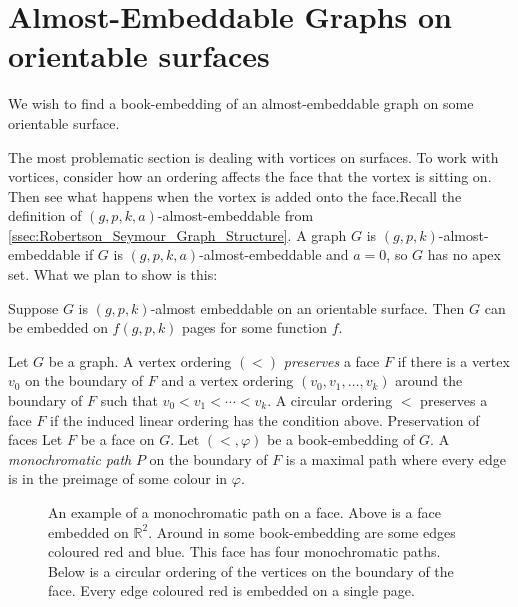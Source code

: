 \section{Almost-Embeddable Graphs on orientable surfaces}

We wish to find a book-embedding of an almost-embeddable graph on some orientable surface. 

The most problematic section is dealing with vortices on surfaces.
To work with vortices, consider how an ordering affects the face that the vortex is sitting on. Then see what happens when the vortex is added onto the face.Recall the definition of $(g, p, k, a)$-almost-embeddable from \cref{ssec:Robertson_Seymour_Graph_Structure}. A graph $G$ is $(g, p, k)$-almost-embeddable if $G$ is $(g, p, k, a)$-almost-embeddable and $a = 0$, so $G$ has no apex set.
What we plan to show is this:
\begin{theorem}\label{thm:bounded_almost_embeddable}
	Suppose $G$ is $(g, p, k)$-almost embeddable on an orientable surface. Then $G$ can be embedded on \(f(g, p, k)\) pages for some function $f$.
\end{theorem}

Let \(G\) be a graph. A vertex ordering \((<)\) \textit{preserves} a face \(F\) if there is a vertex \(v_0\) on the boundary of \(F\) and a vertex ordering \((v_0, v_1, \ldots, v_k)\) around the boundary of \(F\) such that \(v_0 < v_1 < \cdots < v_k\).
A circular ordering \(<\) preserves a face \(F\) if the induced linear ordering has the condition above. Preservation of faces 
Let \(F\) be a face on \(G\). Let \( (<, \varphi) \) be a book-embedding of \(G\). A \textit{monochromatic path} $P$ on the boundary of $F$ is a maximal path where every edge is in the preimage of some colour in $\varphi$.

\begin{figure}[h!]
	\centering
	
	\caption[Monochromatic paths]{An example of a monochromatic path on a face. Above is a face embedded on $\mathbb{R}^2$. Around in some book-embedding are some edges coloured red and blue. This face has four monochromatic paths. Below is a circular ordering of the vertices on the boundary of the face. Every edge coloured red is embedded on a single page.}
\end{figure}


